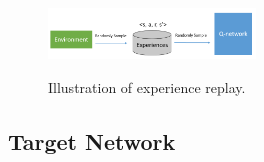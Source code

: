 \begin{figure}[ht!]
	\centering
	\includegraphics[width=0.49\textwidth]{./fig/experience_replay.png} \\
	\caption{Illustration of experience replay.}
	\label{fig:experience_replay}
\end{figure}

\subsection{Target Network}